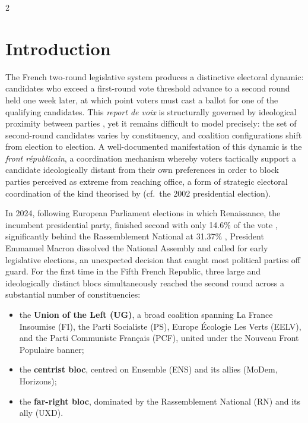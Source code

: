 \documentclass[10pt, a4paper]{article}
\begin{document}
\newpage
\thispagestyle{empty}
\tableofcontents
\newpage

\setlength{\columnsep}{0.6cm}
\begin{multicols}{2}

\section{Introduction}
\label{sec:intro}

The French two-round legislative system produces a distinctive electoral
dynamic: candidates who exceed a first-round vote threshold advance to a
second round held one week later, at which point voters must cast a ballot
for one of the qualifying candidates.
This \emph{report de voix} is structurally governed by ideological proximity
between parties \citep{downs1957}, yet it remains difficult to model
precisely: the set of second-round candidates varies by constituency, and
coalition configurations shift from election to election. A well-documented
manifestation of this dynamic is the \emph{front républicain}, a coordination
mechanism whereby voters tactically support a candidate ideologically distant
from their own preferences in order to block parties perceived as extreme from
reaching office, a form of strategic electoral coordination of the kind
theorised by \citet{cox1997} (cf.\ the 2002 presidential election).

In 2024, following European Parliament elections in which Renaissance, the
incumbent presidential party, finished second with only 14.6\% of the vote ,
significantly behind the Rassemblement National at 31.37\% , President
Emmanuel Macron dissolved the National Assembly and called for early
legislative elections, an unexpected decision that caught most political
parties off guard. For the first time in the Fifth French Republic, three
large and ideologically distinct blocs simultaneously reached the second round
across a substantial number of constituencies:
\begin{itemize}\setlength\itemsep{2pt}
  \item the \textbf{Union of the Left (UG)}, a broad coalition spanning La
        France Insoumise (FI), the Parti Socialiste (PS), Europe \'Ecologie
        Les Verts (EELV), and the Parti Communiste Français (PCF), united
        under the Nouveau Front Populaire banner;
  \item the \textbf{centrist bloc}, centred on Ensemble (ENS) and its allies
        (MoDem, Horizons);
  \item the \textbf{far-right bloc}, dominated by the Rassemblement National
        (RN) and its ally (UXD).
\end{itemize}


\end{multicols}
\end{document}
